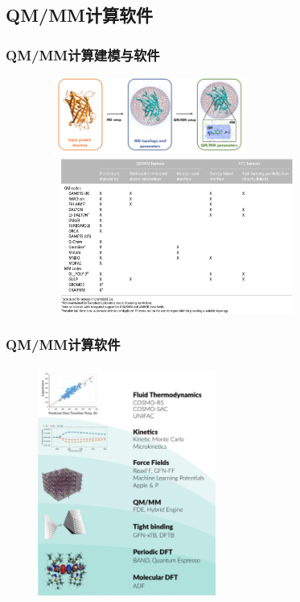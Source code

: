 \subsection{\rm{QM/MM}计算软件}
\frame
{
	\frametitle{\textrm{QM/MM}计算建模与软件}
\begin{figure}[h!]
\centering
\vspace{-13.0pt}
\includegraphics[height=1.00in,width=2.90in,viewport=0 20 920 375,clip]{Figures/QM-MM_modeling.png}
\includegraphics[height=2.00in,width=3.60in,viewport=0 0 1250 820,clip]{Figures/QM-MM-softwares.png}
\label{QM/MM-Modeling}
\end{figure}
}

\frame
{
	\frametitle{\textrm{QM/MM}计算软件}
\begin{figure}[h!]
\centering
\vspace{-13.0pt}
\includegraphics[height=3.00in,width=2.30in,viewport=0 0 350 460,clip]{Figures/AMS-scales-overview-2022.jpg}
\label{QM/MM-Softwares}
\end{figure}
}

